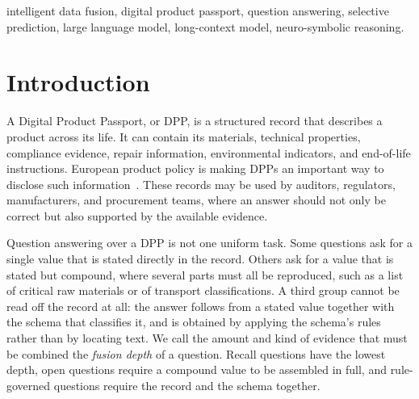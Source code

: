 \documentclass[conference]{IEEEtran}
\begin{document}
\begin{abstract}

\end{abstract}

\begin{IEEEkeywords}
intelligent data fusion, digital product passport, question answering, selective prediction, large language model, long-context model, neuro-symbolic reasoning.
\end{IEEEkeywords}

\section{Introduction}

A Digital Product Passport, or DPP, is a structured record that describes a
product across its life. It can contain its materials, technical properties,
compliance evidence, repair information, environmental indicators, and
end-of-life instructions. European product policy is making DPPs an important
way to disclose such information~\cite{eu2024espr}. These records may be used
by auditors, regulators, manufacturers, and procurement teams, where an answer
should not only be correct but also supported by the available evidence.

Question answering over a DPP is not one uniform task. Some questions ask for a
single value that is stated directly in the record. Others ask for a value that
is stated but compound, where several parts must all be reproduced, such as a
list of critical raw materials or of transport classifications. A third group
cannot be read off the record at all: the answer follows from a stated value
together with the schema that classifies it, and is obtained by applying the
schema's rules rather than by locating text. We call the amount and kind of
evidence that must be combined the \emph{fusion depth} of a question. Recall
questions have the lowest depth, open questions require a compound value to be
assembled in full, and rule-governed questions require the record and the
schema together.
\end{document}
